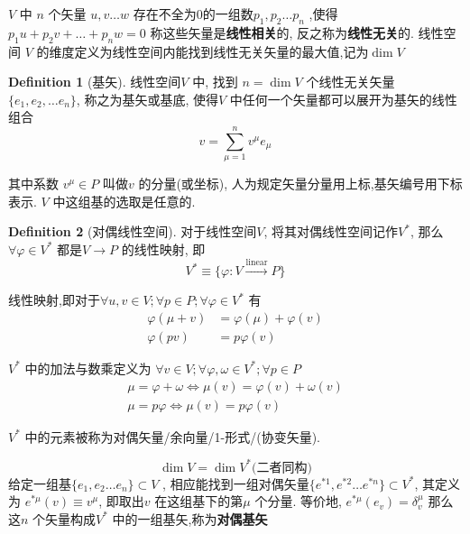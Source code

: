 \documentclass[UTF8]{ctexart}
\theoremstyle{definition}
\newtheorem{definition}{Definition}[section]
\begin{document}
$ V $ 中 $ n $ 个矢量 $ u,v\ldots w  $ 存在不全为$ 0 $的一组数$ p_{1},p_{2}\ldots p_{n} $ ,使得$ p_{1}u + p_{2} v +\ldots + p_n w =0 $ 称这些矢量是\textbf{线性相关}的, 反之称为\textbf{线性无关}的.
线性空间 $ V $ 的维度定义为线性空间内能找到线性无关矢量的最大值,记为$ \dim V $

\begin{definition}[基矢]
  线性空间$ V $ 中, 找到 $ n = \dim V $ 个线性无关矢量$ \{e_{1},e_{2},\ldots e_n\} $, 称之为基矢或基底, 使得$ V $ 中任何一个矢量都可以展开为基矢的线性组合
\[
  v = \sum_{\mu =1}^{n} v^\mu e_\mu
\]
\end{definition}
其中系数 $ v^\mu \in P $ 叫做$ v $ 的分量(或坐标), 人为规定矢量分量用上标,基矢编号用下标表示. $ V $ 中这组基的选取是任意的.

\begin{definition}[对偶线性空间]
  对于线性空间$ V $, 将其对偶线性空间记作$ V^* $, 那么 $ \forall \varphi \in V^* $ 都是$ V \to P $ 的线性映射, 即
  \[
    V^* \equiv \{ \varphi : V \xrightarrow{\text{linear}} P \}
  \]
\end{definition}

线性映射,即对于$ \forall u, v \in V ; \forall p \in P ; \forall \varphi \in V^* $ 有
\begin{align}
  \varphi (\mu + v) &= \varphi (\mu) + \varphi (v) \\
  \varphi (pv) &= p\varphi(v)
\end{align}

$ V^* $ 中的加法与数乘定义为 $ \forall v \in V; \forall \varphi, \omega \in V^*; \forall p \in P $
\begin{align}
  \mu = \varphi + \omega \iff \mu(v) = \varphi(v)+\omega(v) \\
  \mu = p\varphi \iff \mu(v) =p \varphi(v)
\end{align}

$ V^* $ 中的元素被称为对偶矢量/余向量/1-形式/(协变矢量).

\[
  \dim V = \dim V^* \text{(二者同构)}
\]
给定一组基$ \{e_{1},e_{2}\ldots e_n\} \subset V $ , 相应能找到一组对偶矢量$ \{e^{*1},e^{*2}\ldots e^{*n} \} \subset V^* $, 其定义为 $ e^{*\mu}(v) \equiv v^\mu $, 即取出$ v $ 在这组基下的第$ \mu $ 个分量.
等价地, $ e^{*\mu}(e_v) = \delta^\mu_v $
那么这$ n $ 个矢量构成$ V^* $ 中的一组基矢,称为\textbf{对偶基矢}
\end{document}
